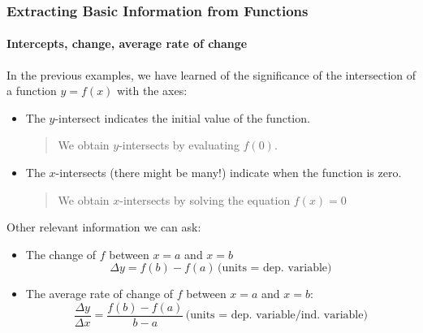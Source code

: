 \documentclass[9pt,xcolor=x11names,compress]{beamer}
\begin{document}
\begin{frame}[c]\frametitle{Extracting Basic Information from Functions}
    
\framesubtitle{Intercepts, change, average rate of change}

In the previous examples, we have learned of the significance of the intersection of a function $y = f(x)$ with the axes:

\begin{itemize}
	\item<2-> The $y$-intersect indicates the \alert{initial value} of the function.

	\begin{quotation}We obtain $y$-intersects by evaluating $f(0)$.\end{quotation}
	\item<3-> The $x$-intersects (there might be many!) indicate when the function is zero.

	\begin{quotation}We obtain $x$-intersects by solving the equation $f(x) = 0$\end{quotation}
\end{itemize}

\pause\pause\pause Other relevant information we can ask:

\begin{itemize}
	\item<4-> The \alert{change} of $f$ between $x=a$ and $x=b$
	\begin{equation*}
	\Delta y = f(b) - f(a)\, \text{(units = dep.~variable)}
	\end{equation*}
	\item<5-> The \alert{average rate of change} of $f$ between $x=a$ and $x=b$:
	\begin{equation*}
	\frac{\Delta y}{\Delta x} = \frac{f(b) - f(a)}{b-a}\, \text{(units = dep.~variable/ind.~variable)}
	\end{equation*}
\end{itemize}
\end{frame}

\subsection{}
\end{document}

